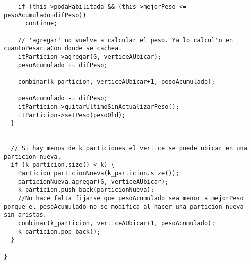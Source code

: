 \begin{lstlisting}
    if (this->podaHabilitada && (this->mejorPeso <= pesoAcumulado+difPeso))
      continue;

    // 'agregar' no vuelve a calcular el peso. Ya lo calcul'o en cuantoPesariaCon donde se cachea.
    itParticion->agregar(G, verticeAUbicar);
    pesoAcumulado += difPeso;

    combinar(k_particion, verticeAUbicar+1, pesoAcumulado);

    pesoAcumulado -= difPeso;
    itParticion->quitarUltimoSinActualizarPeso();
    itParticion->setPeso(pesoOld);
  }
  

  // Si hay menos de k particiones el vertice se puede ubicar en una particion nueva.
  if (k_particion.size() < k) {
    Particion particionNueva(k_particion.size());
    particionNueva.agregar(G, verticeAUbicar);
    k_particion.push_back(particionNueva);
    //No hace falta fijarse que pesoAcumulado sea menor a mejorPeso porque el pesoAcumulado no se modifica al hacer una particion nueva sin aristas.
    combinar(k_particion, verticeAUbicar+1, pesoAcumulado);
    k_particion.pop_back();
  }

}

\end{lstlisting}


